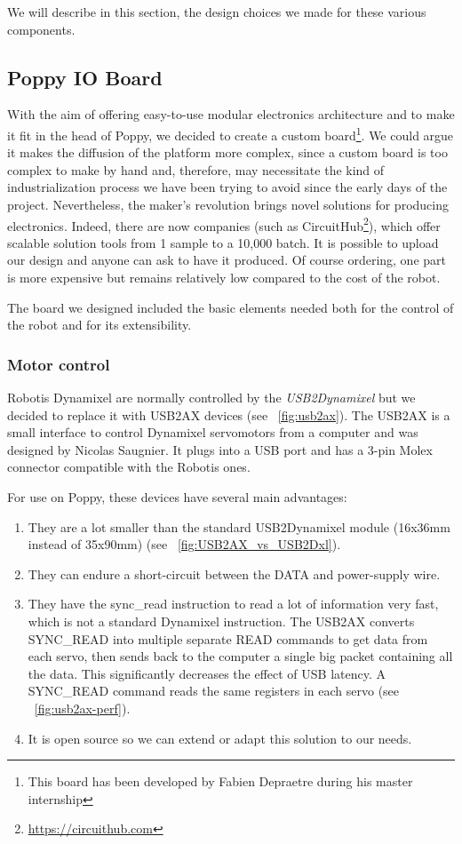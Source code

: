 We will describe in this section, the design choices we made for these various components.

\subsection{Poppy IO Board} %

With the aim of offering easy-to-use modular electronics architecture and to make it fit in the head of Poppy, we decided to create a custom board\footnote{This board has been developed by Fabien Depraetre during his master internship}. We could argue it makes the diffusion of the platform more complex, since a custom board is too complex to make by hand and, therefore, may necessitate the kind of industrialization process we have been trying to avoid since the early days of the project. Nevertheless, the maker’s revolution brings novel solutions for producing electronics. Indeed, there are now companies (such as CircuitHub\footnote{\url{https://circuithub.com}}), which offer scalable solution tools from 1 sample to a 10,000 batch. It is possible to upload our design and anyone can ask to have it produced. Of course ordering, one part is more expensive but remains relatively low compared to the cost of the robot.

The board we designed included the basic elements needed both for the control of the robot and for its extensibility.


\subsubsection{Motor control} %
Robotis Dynamixel are normally controlled by the \emph{USB2Dynamixel} but we decided to replace it with USB2AX devices (see \figurename~\ref{fig:usb2ax}). The USB2AX is a small interface to control Dynamixel servomotors from a computer and was designed by Nicolas Saugnier. It plugs into a USB port and has a 3-pin Molex connector compatible with the Robotis ones.

For use on Poppy, these devices have several main advantages:
\begin{enumerate}
    \item They are a lot smaller than the standard USB2Dynamixel module (16x36mm instead of 35x90mm) (see \figurename~\ref{fig:USB2AX_vs_USB2Dxl}).
    \item They can endure a short-circuit between the DATA and power-supply wire.
    \item They have the sync\_read instruction to read a lot of information very fast, which is not a standard Dynamixel instruction. The USB2AX converts SYNC\_READ into multiple separate READ commands to get data from each servo, then sends back to the computer a single big packet containing all the data. This significantly decreases the effect of USB latency. A SYNC\_READ command reads the same registers in each servo (see \figurename~\ref{fig:usb2ax-perf}).
    \item It is open source so we can extend or adapt this solution to our needs.
\end{enumerate}

